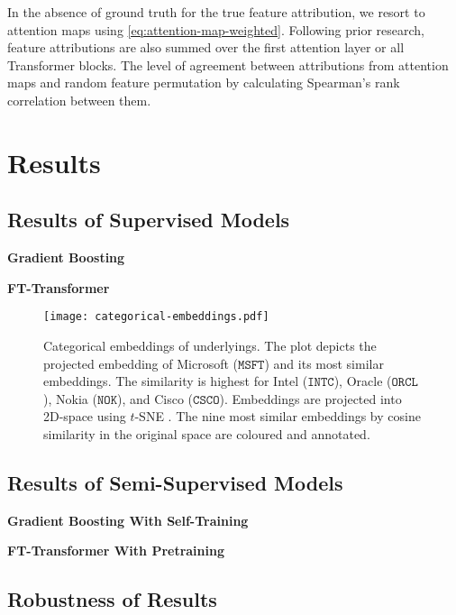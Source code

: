 In the absence of ground truth for the true feature attribution, we resort to attention maps using \cref{eq:attention-map-weighted}. Following prior research, feature attributions are also summed over the first attention layer or all Transformer blocks. The level of agreement between attributions from attention maps and random feature permutation by calculating Spearman's rank correlation between them.

\newpage
\section{Results}\label{sec:results}


\subsection{Results of Supervised
    Models}\label{sec:results-of-supervised-models}

\textbf{Gradient Boosting}

\textbf{FT-Transformer}

\begin{figure}[ht]
    \centering
    \texttt{[image: categorical-embeddings.pdf]}
    \caption[Categorical Embeddings of Underlyings]{Categorical embeddings of underlyings. The plot depicts the projected embedding of Microsoft ($\mathtt{MSFT}$) and its most similar embeddings. The similarity is highest for Intel ($\mathtt{INTC}$), Oracle ($\mathtt{ORCL}$), Nokia ($\mathtt{NOK}$), and Cisco ($\mathtt{CSCO}$). Embeddings are projected into 2D-space using $t$-SNE \autocite{vandermaatenVisualizingDataUsing2008}. The nine most similar embeddings by cosine similarity in the original space are coloured and annotated.}
    \label{fig:categorical-embeddings}
\end{figure}

\subsection{Results of Semi-Supervised
    Models}\label{sec:results-of-semi-supervised-models}


\textbf{Gradient Boosting With Self-Training}

\textbf{FT-Transformer With Pretraining}

\subsection{Robustness of Results}\label{sec:robustness-checks}

